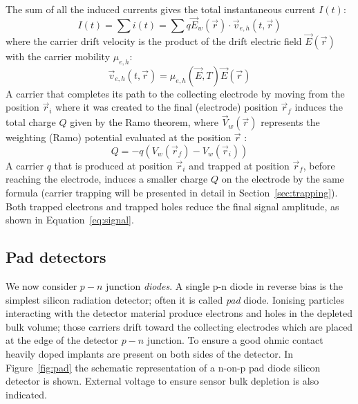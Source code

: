 The sum of all the induced currents gives the total instantaneous current $I(t)$:
\begin{equation}
I(t) = \sum i(t)=\sum q\vec{E}_w(\vec{r})\cdot\vec{v}_{e,h}(t,\vec{r})
\label{eq:current}
\end{equation}
where the carrier drift velocity is the product of the drift electric field $\vec{E}(\vec{r})$ with the carrier mobility $\mu_{e,h}$:
\begin{equation}
\vec{v}_{e,h}(t,\vec{r})=\mu_{e,h}(\vec{E},T)\vec{E}(\vec{r})
\label{eq:carrierV}
\end{equation}
A carrier that completes its path to the collecting electrode by moving from the position $\vec{r}_i$ where it was created to the
final (electrode) position $\vec{r}_f$ induces the total charge $Q$ given by the Ramo theorem, where $\vec{V}_w(\vec{r})$ represents the weighting (Ramo) potential evaluated at the position $\vec{r}$ :
\begin{equation}
Q = - q\left(V_w(\vec{r}_f)-V_w(\vec{r}_i)\right)
\label{eq:signal}
\end{equation}
A carrier $q$ that is produced at position $\vec{r}_i$ and trapped at position $\vec{r}_f$, before 
reaching the electrode, induces a smaller charge $Q$ on the electrode by the same formula 
(carrier trapping will be presented in detail in Section~\ref{sec:trapping}). Both 
trapped electrons and trapped holes reduce the final signal amplitude, as shown in 
Equation~\ref{eq:signal}.

\subsection{Pad detectors}
\label{sec:pads}

We now consider $p-n$ junction {\it diodes}.
A single p-n diode in reverse bias is the simplest silicon radiation detector; 
often it is called {\it pad} diode. Ionising  particles interacting with  the detector material 
produce electrons and holes in the depleted bulk volume; those carriers drift toward 
the collecting electrodes which are placed at the edge of the detector $p-n$ junction. 
To ensure 
a good ohmic contact heavily doped implants are present on both sides of the detector. 
In Figure~\ref{fig:pad} the schematic representation  of a n-on-p pad diode silicon detector is 
shown. External voltage to ensure sensor bulk depletion is also indicated.  


